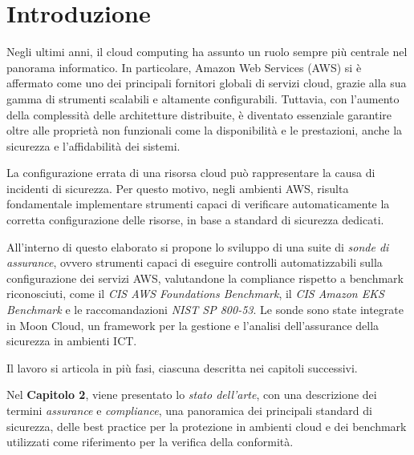 
\chapter{Introduzione}
\label{cap:introduzione}

Negli ultimi anni, il cloud computing ha assunto un ruolo sempre più centrale nel panorama informatico. In particolare, Amazon Web Services (AWS) si è affermato come uno dei principali fornitori globali di servizi cloud, grazie alla sua gamma di strumenti scalabili e altamente configurabili. Tuttavia, con l'aumento della complessità delle architetture distribuite, è diventato essenziale garantire oltre alle proprietà non funzionali come la disponibilità e le prestazioni, anche la sicurezza e l'affidabilità dei sistemi. 

La configurazione errata di una risorsa cloud può rappresentare la causa di incidenti di sicurezza. Per questo motivo, negli ambienti AWS, risulta fondamentale implementare strumenti capaci di verificare automaticamente la corretta configurazione delle risorse, in base a standard di sicurezza dedicati.

All'interno di questo elaborato si propone lo sviluppo di una suite di \emph{sonde di assurance}, ovvero strumenti capaci di eseguire controlli automatizzabili sulla configurazione dei servizi AWS, valutandone la compliance rispetto a benchmark riconosciuti, come il \emph{CIS AWS Foundations Benchmark}, il \emph{CIS Amazon EKS Benchmark} e le raccomandazioni \emph{NIST SP 800-53}. Le sonde sono state integrate in Moon Cloud, un framework per la gestione e l'analisi dell'assurance della sicurezza in ambienti ICT.

Il lavoro si articola in più fasi, ciascuna descritta nei capitoli successivi.

Nel \textbf{Capitolo 2}, viene presentato lo \textit{stato dell'arte}, con una descrizione dei termini \emph{assurance} e \emph{compliance}, una panoramica dei principali standard di sicurezza, delle best practice per la protezione in ambienti cloud e dei benchmark utilizzati come riferimento per la verifica della conformità.


